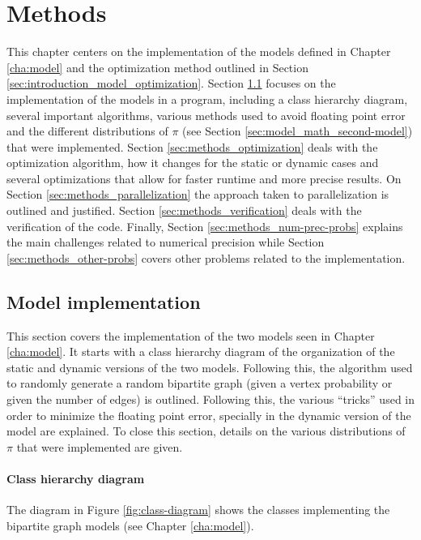 \chapter{Methods}
\label{cha:methods}

This chapter centers on the implementation of the models defined in Chapter \ref{cha:model} and the optimization method outlined in Section \ref{sec:introduction_model_optimization}.
Section \ref{sec:methods_model-implementation} focuses on the implementation of the models in a \CC{} program, including a class hierarchy diagram, several important algorithms, various methods used to avoid floating point error and the different distributions of $\pi$ (see Section \ref{sec:model_math_second-model}) that were implemented.
Section \ref{sec:methods_optimization} deals with the optimization algorithm, how it changes for the static or dynamic cases and several optimizations that allow for faster runtime and more precise results.
On Section \ref{sec:methods_parallelization} the approach taken to parallelization is outlined and justified.
Section \ref{sec:methods_verification} deals with the verification of the code.
Finally, Section \ref{sec:methods_num-prec-probs} explains the main challenges related to numerical precision while Section \ref{sec:methods_other-probs} covers other problems related to the implementation.

\section{Model implementation}
\label{sec:methods_model-implementation}

This section covers the implementation of the two models seen in Chapter \ref{cha:model}.
It starts with a class hierarchy diagram of the organization of the static and dynamic versions of the two models.
Following this, the algorithm used to randomly generate a random bipartite graph (given a vertex probability or given the number of edges) is outlined.
Following this, the various ``tricks'' used in order to minimize the floating point error, specially in the dynamic version of the model are explained.
To close this section, details on the various distributions of $\pi$ that were implemented are given.

\subsubsection{Class hierarchy diagram}

The diagram in Figure \ref{fig:class-diagram} shows the classes implementing the bipartite graph models (see Chapter \ref{cha:model}).

